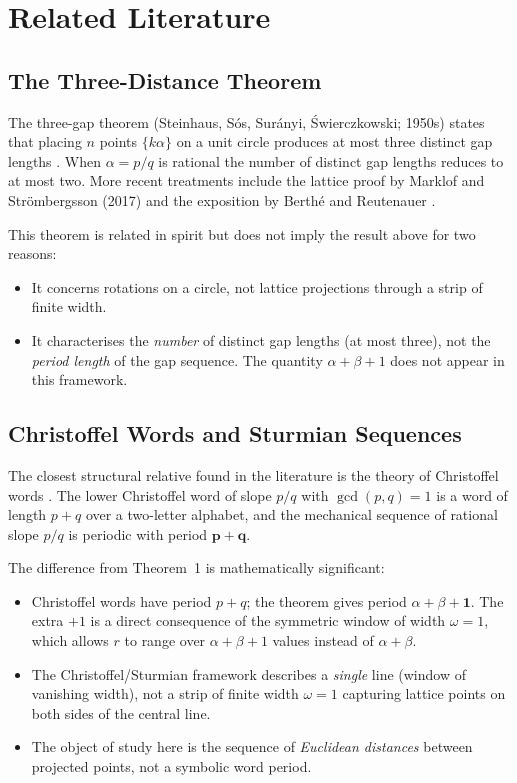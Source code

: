 \documentclass[11pt]{article}
\theoremstyle{plain}
\theoremstyle{remark}
\begin{document}
\section{Related Literature}

\subsection{The Three-Distance Theorem}

The three-gap theorem (Steinhaus, S\'{o}s, Sur\'{a}nyi, \'{S}wierczkowski; 1950s) states
that placing $n$ points $\{k\alpha\}$ on a unit circle produces at most three distinct
gap lengths \cite{ThreeGap}.
When $\alpha = p/q$ is rational the number of distinct gap lengths reduces to at most two.
More recent treatments include the lattice proof by Marklof and Str\"{o}mbergsson (2017)
and the exposition by Berth\'{e} and Reutenauer \cite{BertheReutenauer2024}.

This theorem is related in spirit but does not imply the result above for two reasons:
\begin{itemize}
    \item It concerns rotations on a circle, not lattice projections through a
          strip of finite width.
    \item It characterises the \emph{number} of distinct gap lengths (at most three),
          not the \emph{period length} of the gap sequence.
          The quantity $\alpha + \beta + 1$ does not appear in this framework.
\end{itemize}

\subsection{Christoffel Words and Sturmian Sequences}

The closest structural relative found in the literature is the theory of Christoffel
words \cite{BerstelEtAl2008}.
The lower Christoffel word of slope $p/q$ with $\gcd(p, q) = 1$ is a word of length
$p + q$ over a two-letter alphabet, and the mechanical sequence of rational slope $p/q$
is periodic with period $\mathbf{p + q}$.

The difference from Theorem~1 is mathematically significant:

\begin{itemize}
    \item Christoffel words have period $p + q$; the theorem gives period
          $\alpha + \beta + \mathbf{1}$.
          The extra $+1$ is a direct consequence of the symmetric window of width
          $\omega = 1$, which allows $r$ to range over $\alpha + \beta + 1$ values
          instead of $\alpha + \beta$.
    \item The Christoffel/Sturmian framework describes a \emph{single} line
          (window of vanishing width), not a strip of finite width $\omega = 1$
          capturing lattice points on both sides of the central line.
    \item The object of study here is the sequence of \emph{Euclidean distances}
          between projected points, not a symbolic word period.
\end{itemize}
\end{document}
